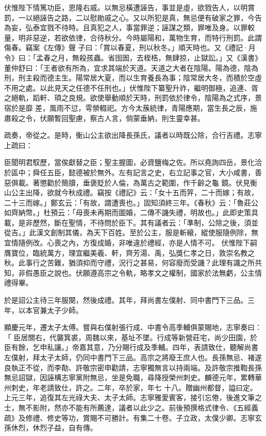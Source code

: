 \begin{pinyinscope}
 伏惟陛下情篤功臣，恩隆右戚。以無忌橫遭誣告，事並是虛，欲戮告人，以明賞罰，一以絕誣告之路，二以慰勛戚之心。又以所犯是真，無忌便有破家之罪，今告為妄，弘泰宜戮不待時。且真犯之人，事當罪逆；誣謀之類，罪唯及身。以罪較量，明非惡逆，若欲依律，合待秋分。今時屬陽和，萬物生育，而特行刑罰。此謂傷春。竊案《左傳》聲
 子曰：「賞以春夏，刑以秋冬。」順天時也。又《禮記·月令》曰：「孟春之月，無殺孩蟲。省囹圄，去桎梏，無肆掠，止獄訟。」又《漢書》董仲舒曰：「王者欲有所為，宜求其端於天道。天道之大者在陰陽。陽為德，陰為刑，刑主殺而德主生。陽常居大夏，而以生育養長為事；陰常居大冬，而積於空虛不用之處。以此見天之任德不任刑也。」伏惟陛下纂聖升祚，繼明御極，追連、胥之絕軌，蹈軒、頊之良規。欲使舉動順於天時，刑罰依於律令，陰陽為之式序，景宿於是靡
 差，風雨不愆，雩禜輟祀。方今太蔟統律，青陽應期，當生長之辰，施肅殺之令，伏願暫回聖慮，察古人言，倘蒙垂納，則生靈幸甚。



 疏奏，帝從之。是時，衡山公主欲出降長孫氏，議者以時既公除，合行吉禮。志寧上疏曰：



 臣聞明君馭歷，當俟獻替之臣；聖主握圖，必資鹽梅之佐。所以堯詢四岳，景化洽於區中；舜任五臣，懿德被於無外。左有記言之史，右立記事之官，大小咸書，善惡俱載。著懲勸於簡牘，垂褒貶於人倫，為萬古之範圍，作千齡之龜
 鏡。伏見衡山公主出降，欲就今秋成禮。竊按《禮記》云：「女十五而笄，二十而嫁；有故，二十三而嫁。」鄭玄云：「有故，謂遭喪也。」固知須終三年。《春秋》云：「魯莊公如齊納幣。」杜預云：「母喪未再期而圖婚，二傳不譏失禮，明故也。」此即史策具載，是非歷然，斷在聖情，不待問於臣下。其有議者云：「準制，公除之後，須並從吉。」此漢文創制其儀，為天下百姓。至於公主，服是斬縗，縱使服隨例除，無宜情隨例改。心喪之內，方復成婚，非唯違於禮經，亦是人情不可。
 伏惟陛下嗣膺寶位，臨統萬方，理宜繼美羲、軒，齊芳湯、禹，弘獎仁孝之日，敦崇名教之秋。此事行之苦難，猶須抑而守禮，況行之甚易，何容廢而受譏？此理有識之所共知，非假愚臣之說也。伏願遵高宗之令軌，略孝文之權制，國家於法無虧，公主情禮得畢。



 於是詔公主待三年服闋，然後成禮。其年，拜尚書左僕射、同中書門下三品。三年，以本官兼太子少師。



 顯慶元年，遷太子太傅。嘗與右僕射張行成、中書令高季輔俱蒙賜地，志寧奏曰：「
 臣居關右，代襲箕裘，周魏以來，基址不墜。行成等新營莊宅，尚少田園，於臣有餘，乞申私讓。」帝嘉其意，乃分賜行成及季輔。四年，表請致仕，聽解尚書左僕射，拜太子太師，仍同中書門下三品。高宗之將廢王庶人也。長孫無忌、褚遂良執正不從，而李勣、許敬宗密申勸請，志寧獨無言以持兩端。及許敬宗推鞫長孫無忌詔獄，因誣構志寧黨附無忌，坐是免職，尋降授榮州刺史。麟德元年，累轉華州刺史，年老請致仕，許之。二年，卒於家，年七
 十八。贈幽州都督，謚曰定。上元三年，追復其左光祿大夫、太子太師。志寧雅愛賓客，接引忘倦，後進文筆之士，無不影附，然亦不能有所薦達，議者以此少之。前後預撰格式律令、《五經義疏》及修禮、修史等功，賞賜不可勝計。有集二十卷。子立政，太僕少卿。志寧玄孫休烈，休烈子益，自有傳。




\end{pinyinscope}
